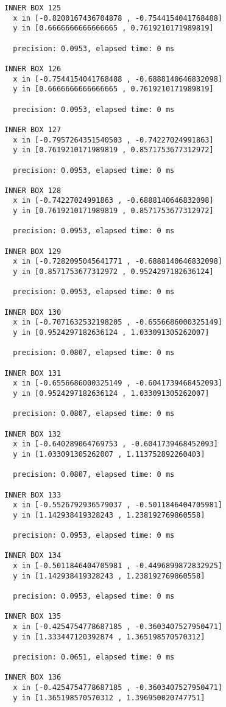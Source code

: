\begin{verbatim}
INNER BOX 125
  x in [-0.8200167436704878 , -0.7544154041768488]
  y in [0.6666666666666665 , 0.7619210171989819]

  precision: 0.0953, elapsed time: 0 ms

INNER BOX 126
  x in [-0.7544154041768488 , -0.6888140646832098]
  y in [0.6666666666666665 , 0.7619210171989819]

  precision: 0.0953, elapsed time: 0 ms

INNER BOX 127
  x in [-0.7957264351540503 , -0.74227024991863]
  y in [0.7619210171989819 , 0.8571753677312972]

  precision: 0.0953, elapsed time: 0 ms

INNER BOX 128
  x in [-0.74227024991863 , -0.6888140646832098]
  y in [0.7619210171989819 , 0.8571753677312972]

  precision: 0.0953, elapsed time: 0 ms

INNER BOX 129
  x in [-0.7282095045641771 , -0.6888140646832098]
  y in [0.8571753677312972 , 0.9524297182636124]

  precision: 0.0953, elapsed time: 0 ms

INNER BOX 130
  x in [-0.7071632532198205 , -0.6556686000325149]
  y in [0.9524297182636124 , 1.033091305262007]

  precision: 0.0807, elapsed time: 0 ms

INNER BOX 131
  x in [-0.6556686000325149 , -0.6041739468452093]
  y in [0.9524297182636124 , 1.033091305262007]

  precision: 0.0807, elapsed time: 0 ms

INNER BOX 132
  x in [-0.640289064769753 , -0.6041739468452093]
  y in [1.033091305262007 , 1.113752892260403]

  precision: 0.0807, elapsed time: 0 ms

INNER BOX 133
  x in [-0.5526792936579037 , -0.5011846404705981]
  y in [1.142938419328243 , 1.238192769860558]

  precision: 0.0953, elapsed time: 0 ms

INNER BOX 134
  x in [-0.5011846404705981 , -0.4496899872832925]
  y in [1.142938419328243 , 1.238192769860558]

  precision: 0.0953, elapsed time: 0 ms

INNER BOX 135
  x in [-0.4254754778687185 , -0.3603407527950471]
  y in [1.333447120392874 , 1.365198570570312]

  precision: 0.0651, elapsed time: 0 ms

INNER BOX 136
  x in [-0.4254754778687185 , -0.3603407527950471]
  y in [1.365198570570312 , 1.396950020747751]


\end{verbatim}
